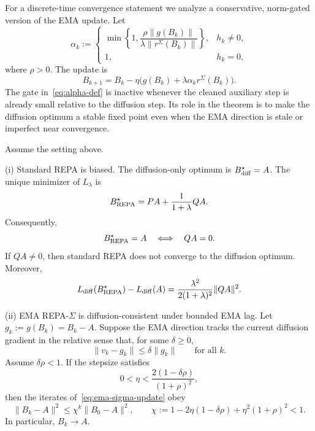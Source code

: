 For a discrete-time convergence statement we analyze a conservative,
norm-gated version of the EMA update. Let
\begin{equation}
    \alpha_k
    :=
    \begin{cases}
    \min\left\{1,\dfrac{\rho\|g(B_k)\|}{\lambda\|r^{\Sigma}(B_k)\|}\right\},
    & h_k\neq0,\\[1.1em]
    1,
    & h_k=0,
    \end{cases}
    \label{eq:alpha-def}
\end{equation}
where $\rho>0$. The update is
\begin{equation}
    B_{k+1}
    =
    B_k - \eta\bigl(g(B_k)+\lambda\alpha_k r^{\Sigma}(B_k)\bigr).
    \label{eq:ema-sigma-update}
\end{equation}
The gate in~\eqref{eq:alpha-def} is inactive whenever the cleaned auxiliary
step is already small relative to the diffusion step. Its role in the theorem
is to make the diffusion optimum a stable fixed point even when the EMA
direction is stale or imperfect near convergence.

\begin{theorem}
\label{thm:linear-repa-sigma}
Assume the setting above.

\textup{(i) Standard REPA is biased.}
The diffusion-only optimum is $B^\star_{\rm diff}=A$. The unique minimizer of
$L_\lambda$ is
\begin{equation}
    B^\star_{\rm REPA}
    =
    PA + \frac{1}{1+\lambda}QA .
    \label{eq:biased-repa-optimum}
\end{equation}
Consequently,
\[
    B^\star_{\rm REPA}=A
    \quad\Longleftrightarrow\quad
    QA=0 .
\]
If $QA\neq0$, then standard REPA does not converge to the diffusion optimum.
Moreover,
\begin{equation}
    L_{\rm diff}(B^\star_{\rm REPA}) - L_{\rm diff}(A)
    =
    \frac{\lambda^2}{2(1+\lambda)^2}\|QA\|^2 .
    \label{eq:excess-diff-risk}
\end{equation}

\textup{(ii) EMA REPA-$\Sigma$ is diffusion-consistent under bounded EMA lag.}
Let $g_k:=g(B_k)=B_k-A$. Suppose the EMA direction tracks the current diffusion
gradient in the relative sense that, for some $\delta\ge0$,
\begin{equation}
    \|v_k-g_k\|\le \delta\|g_k\|
    \qquad\text{for all }k .
    \label{eq:ema-lag-assumption}
\end{equation}
Assume $\delta\rho<1$. If the stepsize satisfies
\begin{equation}
    0<\eta<\frac{2(1-\delta\rho)}{(1+\rho)^2},
    \label{eq:eta-condition}
\end{equation}
then the iterates of~\eqref{eq:ema-sigma-update} obey
\begin{equation}
    \|B_k-A\|^2
    \le
    \chi^k\|B_0-A\|^2,
    \qquad
    \chi
    :=
    1-2\eta(1-\delta\rho)+\eta^2(1+\rho)^2
    <1 .
    \label{eq:linear-convergence-bound}
\end{equation}
In particular, $B_k\to A$.
\end{theorem}

